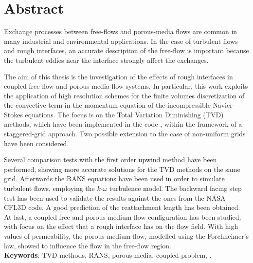 \chapter*{Abstract}
Exchange processes between free-flows and porous-media flows are common in many 
industrial and environmental applications. In the case of turbulent flows and 
rough interfaces, an accurate description of the free-flow is important because 
the turbulent eddies near the interface strongly affect the exchanges.

The aim of this thesis is the investigation of the effects of rough interfaces in coupled free-flow and porous-media flow systems. In particular, this work exploits the application of high resolution schemes for 
the finite volumes discretization of the convective term in the momentum 
equation of the incompressible Navier-Stokes equations. The 
focus is on the Total Variation Diminishing (TVD) methods, which have been 
implemented in the code \DUMUX, within the framework of a staggered-grid 
approach. Two possible extension to the case of non-uniform grids have been 
considered.

Several comparison tests with the first order upwind method have been 
performed, showing more accurate solutions for the TVD methods on the same grid.
Afterwards the RANS equations have been used in order to simulate turbulent 
flows, employing the $k\text{-}\omega$ turbulence model. The backward facing 
step test has been used to validate the results against the 
ones from the NASA CFL3D code. A good prediction of the reattachment length has 
been obtained. At last, a coupled free and porous-medium flow configuration has 
been studied, with focus on the effect that a rough interface has on the flow 
field. With high values of permeability, the porous-medium flow, modelled using 
the Forchheimer's law, showed to influence the flow in the free-flow region.
\\[\baselineskip]
\textbf{Keywords}: TVD methods, RANS, porous-media, coupled problem, \DUMUX.